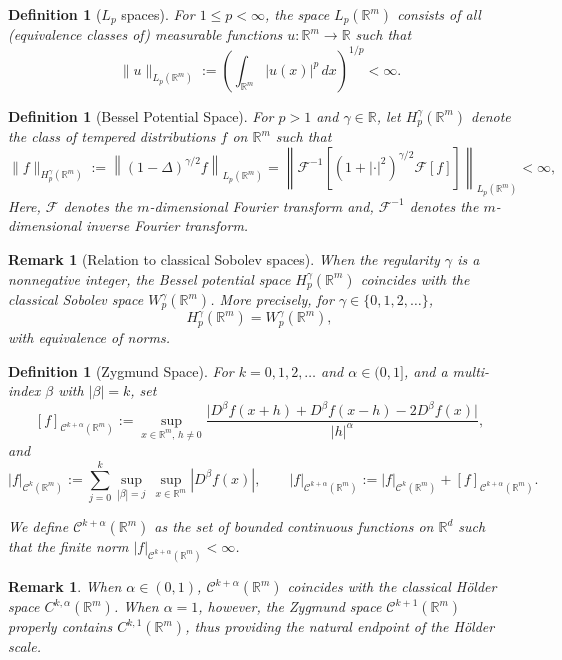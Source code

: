 \documentclass[11pt,reqno]{amsart}
\numberwithin{equation}{section}
\newtheorem{remark}[theorem]{\bf{Remark}}
\newtheorem{definition}[theorem]{Definition}
\theoremstyle{remark}
\theoremstyle{definition}
\newcommand\bR{\mathbb{R}}
\newcommand\cC{\mathcal{C}}
\newcommand\cF{\mathcal{F}}
\begin{document}
\begin{definition}[$L_p$ spaces]
For $1\le p<\infty$,  the space $L_p(\bR^m)$ consists of all (equivalence classes of) measurable functions
$u:\bR^m\to\mathbb{R}$ such that
\[
\|u\|_{L_p(\bR^m)}
:= \left(\int_{\bR^m} |u(x)|^p\,dx\right)^{1/p} < \infty.
\]
\end{definition}


\begin{definition}[Bessel Potential Space]
For $p>1$ and $\gamma \in \bR$, let $H_{p}^{\gamma}(\bR^{m})$ denote the class of tempered distributions $f$ on $\bR^m$ such that
\begin{equation*}
\| f \|_{H_{p}^{\gamma}(\bR^{m})} 
:= \left\| (1-\Delta)^{\gamma/2} f  \right\|_{L_p(\bR^m)} 
= \left\| \cF^{-1}\left[ \left(1+|\cdot|^2\right)^{\gamma/2}\cF[f]\right] \right\|_{L_p(\bR^m)}
<\infty,
\end{equation*}
Here, $\cF$ denotes the $m$-dimensional Fourier transform and, $\cF^{-1}$ denotes the $m$-dimensional inverse Fourier transform. 
\end{definition}


\begin{remark}[Relation to classical Sobolev spaces]
When the regularity $\gamma$ is a nonnegative integer, the Bessel potential space
$H_p^\gamma(\mathbb{R}^m)$ coincides with the classical Sobolev space
$W_{p}^{\gamma}(\mathbb{R}^m)$.
More precisely, for $\gamma\in\{0,1,2,\dots\}$,
\[
H_p^\gamma(\mathbb{R}^m)=W_{p}^{\gamma}(\mathbb{R}^m),
\]
with equivalence of norms.
\end{remark}


\begin{definition}[Zygmund Space]
\label{zygmund space}
For $k = 0,1,2,\dots$ and $\alpha \in (0,1]$, and a multi-index $\beta$ with $|\beta|=k$, set
\[
[f]_{\cC^{k+\alpha}(\bR^{m})} := 
\sup_{x \in \bR^m,\, h \neq 0}
\frac{\big| D^\beta f(x+h) + D^\beta f(x-h) - 2D^\beta f(x) \big|}{|h|^\alpha},
\]
and
\[
|f|_{\cC^k(\bR^{m})} := \sum_{j=0}^k \sup_{|\beta|=j}\, \sup_{x \in \mathbb{R}^m} |D^\beta f(x)|,
\qquad
|f|_{\cC^{k+\alpha}(\bR^{m})} := |f|_{\cC^k(\bR^{m})} + [f]_{\cC^{k+\alpha}(\bR^{m})}.
\]

We define $\cC^{k+\alpha}(\mathbb{R}^m)$ as the set of bounded continuous functions on $\mathbb{R}^d$ such that the finite norm 
$|f|_{\cC^{k+\alpha}(\bR^{m})} < \infty$.
\end{definition}

\begin{remark}
When $\alpha\in(0,1)$, $\cC^{k+\alpha}(\mathbb{R}^m)$ coincides with the classical H\"older space $C^{k,\alpha}(\bR^{m})$.
When $\alpha=1$, however, the Zygmund space $\cC^{k+1}(\bR^{m})$ properly contains $C^{k,1}(\bR^{m})$,
thus providing the natural endpoint of the H\"older scale.
\end{remark}
\end{document}
